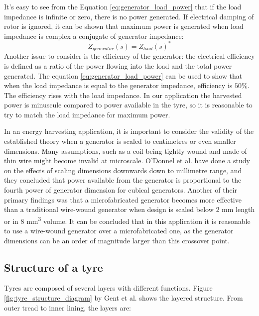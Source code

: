 It's easy to see from the Equation \eqref{eq:generator_load_power} that if the load impedance is infinite or zero, there is no power generated. If electrical damping of rotor is ignored, it can be shown that maximum power is generated when load impedance is complex a conjugate of generator impedance: 
\begin{equation} \label{eq:matched_load}
Z_{generator}(s) = {Z_{load}(s)}^*
\end{equation}
Another issue to consider is the efficiency of the generator: the electrical efficiency is defined as a ratio of the power flowing into the load and the total power generated. The equation \eqref{eq:generator_load_power} can be used to show that when the load impedance is equal to the generator impedance, efficiency is $ 50 \%$. The efficiency rises with the load impedance. In our application the harvested power is minuscule compared to power available in the tyre, so it is reasonable to try to match the load impedance for maximum power.

In an energy harvesting application, it is important to consider the validity of the established theory when a generator is scaled to centimetres or even smaller dimensions. Many assumptions, such as a coil being tightly wound and made of thin wire might become invalid at microscale. O'Donnel et al. \cite{ODonnell2007} have done a study on the effects of scaling dimensions downwards down to millimetre range, and they concluded that power available from the generator is proportional to the fourth power of generator dimension for cubical generators. Another of their primary findings was that a microfabricated generator becomes more effective than a traditional wire-wound generator when design is scaled below 2 mm length or in 8 mm\textsuperscript{3} volume. It can be concluded that in this application it is reasonable to use a wire-wound generator over a microfabricated one, as the generator dimensions can be an order of magnitude larger than this crossover point. 


\subsection{Structure of a tyre}

Tyres are composed of several layers with different functions. Figure \ref{fig:tyre_structure_diagram} by Gent et al. \cite{Gent2005} shows the layered structure. From outer tread to inner lining, the layers are: 

